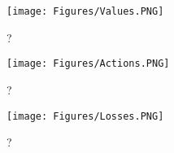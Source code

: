 \documentclass[11.7pt]{article}
\begin{document}
\begin{figure}
    \centering
    \texttt{[image: Figures/Values.PNG]}
    \caption{?}
    \label{fig:Values}
\end{figure}
    
\begin{figure}
    \centering
    \texttt{[image: Figures/Actions.PNG]}
    \caption{?}
    \label{fig:Actions}
\end{figure}

\begin{figure}
    \centering
    \texttt{[image: Figures/Losses.PNG]}
    \caption{?}
    \label{fig:Losses}
\end{figure}
\end{document}
